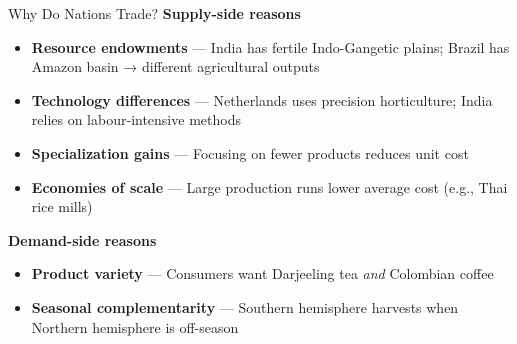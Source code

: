 \documentclass[
  ignorenonframetext,
  aspectratio=169,
]{beamer}
\makeatletter
\providecommand{\tightlist}{%
  \setlength{\itemsep}{0pt}\setlength{\parskip}{0pt}}
\let\quarto@originallabel\label
\DeclareRobustCommand*{\label}[1]{\quarto@originallabel{#1}}
\makeatother
\begin{document}
\begin{frame}{Why Do Nations Trade?}
\label{why-do-nations-trade}
\textbf{Supply-side reasons}

\begin{itemize}
\tightlist
\item
  \textbf{Resource endowments} --- India has fertile Indo-Gangetic
  plains; Brazil has Amazon basin → different agricultural outputs
\item
  \textbf{Technology differences} --- Netherlands uses precision
  horticulture; India relies on labour-intensive methods
\item
  \textbf{Specialization gains} --- Focusing on fewer products reduces
  unit cost
\item
  \textbf{Economies of scale} --- Large production runs lower average
  cost (e.g., Thai rice mills)
\end{itemize}

\textbf{Demand-side reasons}

\begin{itemize}
\tightlist
\item
  \textbf{Product variety} --- Consumers want Darjeeling tea \emph{and}
  Colombian coffee
\item
  \textbf{Seasonal complementarity} --- Southern hemisphere harvests
  when Northern hemisphere is off-season
\end{itemize}

\end{frame}
\end{document}

